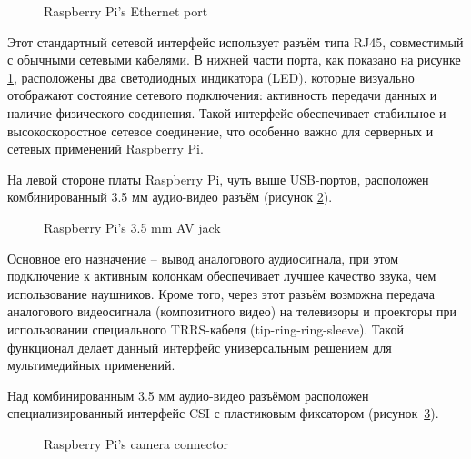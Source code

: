 \begin{figure}[H]
	\centering
	\caption{Raspberry Pi’s Ethernet port}
	\label{fig:ethernet}
\end{figure}

Этот стандартный сетевой интерфейс использует разъём типа RJ45, совместимый с обычными сетевыми кабелями. В нижней части порта, как показано на рисунке \ref{fig:ethernet}, расположены два светодиодных индикатора (LED), которые визуально отображают состояние сетевого подключения: активность передачи данных и наличие физического соединения. Такой интерфейс обеспечивает стабильное и высокоскоростное сетевое соединение, что особенно важно для серверных и сетевых применений Raspberry Pi.

На левой стороне платы Raspberry Pi, чуть выше USB-портов, расположен комбинированный 3.5 мм аудио-видео разъём (рисунок \ref{fig:jack}).

\begin{figure}[H]
	\centering
	\caption{Raspberry Pi’s 3.5 mm AV jack}
	\label{fig:jack}
\end{figure}

Основное его назначение -- вывод аналогового аудиосигнала, при этом подключение к активным колонкам обеспечивает лучшее качество звука, чем использование наушников. Кроме того, через этот разъём возможна передача аналогового видеосигнала (композитного видео) на телевизоры и проекторы при использовании специального TRRS-кабеля (tip-ring-ring-sleeve). Такой функционал делает данный интерфейс универсальным решением для мультимедийных применений.

Над комбинированным 3.5 мм аудио-видео разъёмом расположен специализированный интерфейс CSI с пластиковым фиксатором (рисунок~\ref{fig:camera}).

\begin{figure}[H]
	\centering
	\caption{Raspberry Pi’s camera connector}
	\label{fig:camera}
\end{figure}

